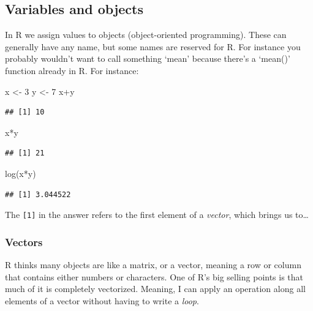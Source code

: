 \documentclass[
]{article}
\newenvironment{Shaded}{\begin{snugshade}}{\end{snugshade}}
\newcommand{\DecValTok}[1]{\textcolor[rgb]{0.00,0.00,0.81}{#1}}
\newcommand{\FunctionTok}[1]{\textcolor[rgb]{0.00,0.00,0.00}{#1}}
\newcommand{\NormalTok}[1]{#1}
\newcommand{\OtherTok}[1]{\textcolor[rgb]{0.56,0.35,0.01}{#1}}
\newcommand{\SpecialCharTok}[1]{\textcolor[rgb]{0.00,0.00,0.00}{#1}}
\begin{document}
\hypertarget{variables-and-objects}{%
\subsection{Variables and objects}\label{variables-and-objects}}

In R we assign values to objects (object-oriented programming). These
can generally have any name, but some names are reserved for R. For
instance you probably wouldn't want to call something `mean' because
there's a `mean()' function already in R. For instance:

\begin{Shaded}
\begin{Highlighting}[]
\NormalTok{x }\OtherTok{\textless{}{-}} \DecValTok{3}
\NormalTok{y }\OtherTok{\textless{}{-}} \DecValTok{7}
\NormalTok{x}\SpecialCharTok{+}\NormalTok{y}
\end{Highlighting}
\end{Shaded}

\begin{verbatim}
## [1] 10
\end{verbatim}

\begin{Shaded}
\begin{Highlighting}[]
\NormalTok{x}\SpecialCharTok{*}\NormalTok{y}
\end{Highlighting}
\end{Shaded}

\begin{verbatim}
## [1] 21
\end{verbatim}

\begin{Shaded}
\begin{Highlighting}[]
\FunctionTok{log}\NormalTok{(x}\SpecialCharTok{*}\NormalTok{y)}
\end{Highlighting}
\end{Shaded}

\begin{verbatim}
## [1] 3.044522
\end{verbatim}

The \texttt{{[}1{]}} in the answer refers to the first element of a \emph{vector}, which
brings us to\ldots{}

\hypertarget{vectors}{%
\subsubsection{Vectors}\label{vectors}}

R thinks many objects are like a matrix, or a vector, meaning a row or
column that contains either numbers or characters. One of R's big
selling points is that much of it is completely vectorized. Meaning, I
can apply an operation along all elements of a vector without having to
write a \emph{loop}.
\end{document}
